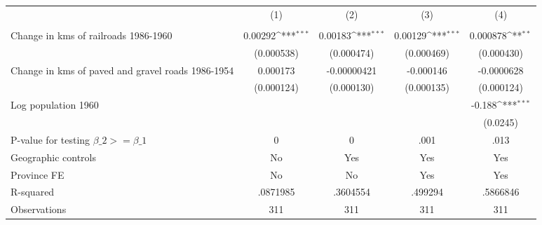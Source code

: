 {
\def\sym#1{\ifmmode^{#1}\else\(^{#1}\)\fi}
\begin{tabular}{l*{4}{c}}
\hline\hline
                &\multicolumn{1}{c}{(1)}&\multicolumn{1}{c}{(2)}&\multicolumn{1}{c}{(3)}&\multicolumn{1}{c}{(4)}\\
                &\multicolumn{1}{c}{}&\multicolumn{1}{c}{}&\multicolumn{1}{c}{}&\multicolumn{1}{c}{}\\
\hline
Change in kms of railroads 1986-1960&  0.00292\sym{***}&  0.00183\sym{***}&  0.00129\sym{***}& 0.000878\sym{**} \\
                &(0.000538)         &(0.000474)         &(0.000469)         &(0.000430)         \\
[1em]
Change in kms of paved and gravel roads 1986-1954& 0.000173         &-0.00000421         &-0.000146         &-0.0000628         \\
                &(0.000124)         &(0.000130)         &(0.000135)         &(0.000124)         \\
[1em]
Log population 1960&                  &                  &                  &   -0.188\sym{***}\\
                &                  &                  &                  & (0.0245)         \\
\hline
P-value for testing $\beta\_{2} >= \beta\_{1}$&        0         &        0         &     .001         &     .013         \\
Geographic controls&       No         &      Yes         &      Yes         &      Yes         \\
Province FE     &       No         &       No         &      Yes         &      Yes         \\
R-squared       & .0871985         & .3604554         &  .499294         & .5866846         \\
Observations    &      311         &      311         &      311         &      311         \\
\hline\hline
\end{tabular}
}
